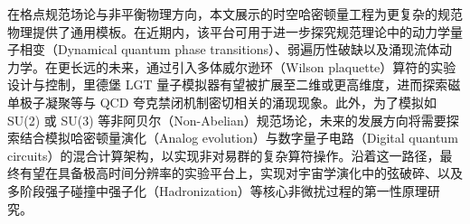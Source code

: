 \documentclass[../main.tex]{subfiles}
\begin{document}
在格点规范场论与非平衡物理方向，本文展示的时空哈密顿量工程为更复杂的规范物理提供了通用模板。在近期内，该平台可用于进一步探究规范理论中的动力学量子相变（Dynamical quantum phase transitions）、弱遍历性破缺以及涌现流体动力学。在更长远的未来，通过引入多体威尔逊环（Wilson plaquette）算符的实验设计与控制，里德堡 LGT 量子模拟器有望被扩展至二维或更高维度，进而探索磁单极子凝聚等与 QCD 夸克禁闭机制密切相关的涌现现象。此外，为了模拟如 SU(2) 或 SU(3) 等非阿贝尔（Non-Abelian）规范场论，未来的发展方向将需要探索结合模拟哈密顿量演化（Analog evolution）与数字量子电路（Digital quantum circuits）的混合计算架构，以实现非对易群的复杂算符操作。沿着这一路径，最终有望在具备极高时间分辨率的实验平台上，实现对宇宙学演化中的弦破碎、以及多阶段强子碰撞中强子化（Hadronization）等核心非微扰过程的第一性原理研究。
\end{document}
